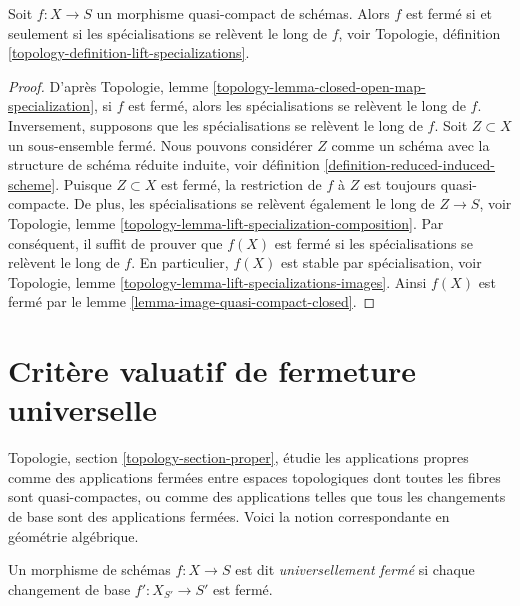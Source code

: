 \begin{lemma}
\label{lemma-quasi-compact-closed}
Soit $f : X \to S$ un morphisme quasi-compact de schémas. Alors
$f$ est fermé si et seulement si les spécialisations se relèvent
le long de $f$,
voir Topologie, définition \ref{topology-definition-lift-specializations}.
\end{lemma}

\begin{proof}
D'après Topologie,
lemme \ref{topology-lemma-closed-open-map-specialization}, si $f$ est
fermé, alors les spécialisations se relèvent le long de $f$.
Inversement, supposons que les spécialisations se relèvent le long de
$f$. Soit $Z \subset X$ un sous-ensemble fermé. Nous pouvons
considérer $Z$ comme un schéma avec la structure de schéma réduite
induite, voir définition \ref{definition-reduced-induced-scheme}.
Puisque $Z \subset X$ est fermé, la restriction
de $f$ à $Z$ est toujours quasi-compacte. De plus, les spécialisations se
relèvent également le long de $Z
\to S$, voir Topologie, lemme \ref{topology-lemma-lift-specialization-composition}.
Par conséquent, il suffit de prouver que $f(X)$ est fermé si les spécialisations se relèvent
le long de $f$. En particulier, $f(X)$ est stable par spécialisation,
voir Topologie, lemme \ref{topology-lemma-lift-specializations-images}.
Ainsi $f(X)$ est fermé
par le lemme \ref{lemma-image-quasi-compact-closed}.
\end{proof}










\section{Critère valuatif de fermeture universelle}
\label{section-valuative-criterion-universal-closedness}

\noindent
Topologie, section \ref{topology-section-proper}, étudie les applications
propres comme des applications fermées entre espaces topologiques dont toutes
les fibres sont quasi-compactes, ou comme des applications telles que tous
les changements de base sont des applications fermées. Voici la notion correspondante
en géométrie algébrique.

\begin{definition}
\label{definition-universally-closed}
Un morphisme de schémas $f : X \to S$ est dit {\it
universellement fermé} si chaque changement de base
$f' : X_{S'} \to S'$ est fermé.
\end{definition}

